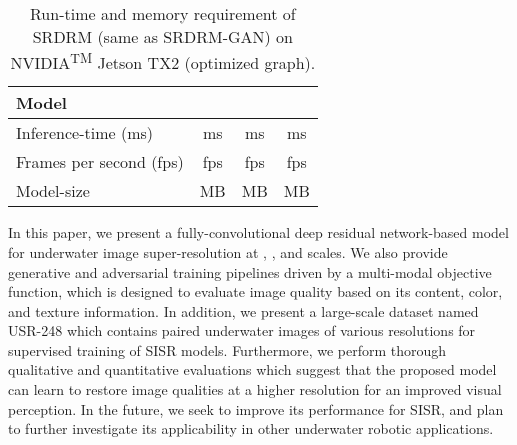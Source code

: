 \documentclass[10pt,twocolumn,letterpaper]{article}
\begin{document}
\begin{table}[t]
\centering
\caption{Run-time and memory requirement of SRDRM (same as SRDRM-GAN) on NVIDIA\textsuperscript{TM} Jetson TX2 (optimized graph).}
\footnotesize
\begin{tabular}{l||c|c|c}
  \hline
  \textbf{Model} &   &   &   \\ \hline \hline
  Inference-time (ms) &   ms  &   ms &  ms \\
  Frames per second (fps)  &   fps &    fps &   fps \\
  \hline
  Model-size &   MB &   MB &  MB \\ \hline
\end{tabular}
\vspace{-3mm}
\label{tab:time}
\end{table}%
In this paper, we present a fully-convolutional deep residual network-based model for underwater image super-resolution at , , and  scales. 
We also provide generative and adversarial training pipelines driven by a multi-modal objective function, which is designed to evaluate image quality based on its content, color, and texture information. 
In addition, we present a large-scale dataset named USR-248 which contains paired underwater images of various resolutions for supervised training of SISR models. 
Furthermore, we perform thorough qualitative and quantitative evaluations which suggest that the proposed model can learn to restore image qualities at a higher resolution for an improved visual perception. 
In the future, we seek to improve its performance for  SISR, and plan to further investigate its applicability in other underwater robotic applications.



%
 


{\small


}
\end{document}
